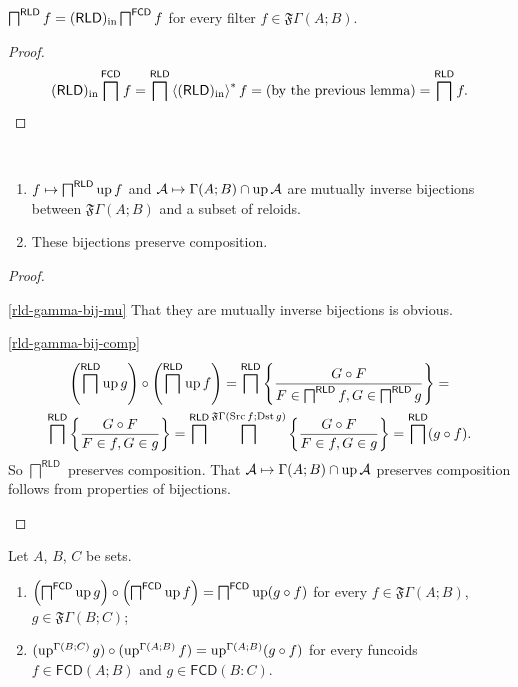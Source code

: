 \begin{lem}
\label{rld-in-fcd-meet}$\bigsqcap^{\mathsf{RLD}} f=(\mathsf{RLD})_{\mathrm{in}}\bigsqcap^{\mathsf{FCD}} f$
for every filter $f\in\mathfrak{F}\Gamma(A;B)$.\end{lem}
\begin{proof}
~
\[
(\mathsf{RLD})_{\mathrm{in}}\bigsqcap^{\mathsf{FCD}} f=\bigsqcap^{\mathsf{RLD}}\left\langle (\mathsf{RLD})_{\mathrm{in}}\right\rangle ^{\ast} f=
\text{(by the previous lemma)}=\bigsqcap^{\mathsf{RLD}} f.
\]
\end{proof}
\begin{lem}
\label{rld-gamma-bij}~
\begin{enumerate}
\item \label{rld-gamma-bij-mu}$f\mapsto\bigsqcap^{\mathsf{RLD}}\operatorname{up} f$
and $\mathcal{A}\mapsto\Gamma(A;B)\cap\operatorname{up}\mathcal{A}$ are mutually
inverse bijections between $\mathfrak{F}\Gamma(A;B)$ and a subset
of reloids.
\item \label{rld-gamma-bij-comp}These bijections preserve composition.
\end{enumerate}
\end{lem}
\begin{proof}
~
\begin{widedisorder}
\item [{\ref{rld-gamma-bij-mu}}] That they are mutually inverse bijections
is obvious.
\item [{\ref{rld-gamma-bij-comp}}] ~
\begin{multline*}
\left(\bigsqcap^{\mathsf{RLD}}\operatorname{up} g\right)\circ\left(\bigsqcap^{\mathsf{RLD}}\operatorname{up} f\right)=\bigsqcap^{\mathsf{RLD}}\left\{ \frac{G\circ F}{F\in\bigsqcap^{\mathsf{RLD}}f,G\in\bigsqcap^{\mathsf{RLD}}g}\right\}=\\
\bigsqcap^{\mathsf{RLD}}\left\{ \frac{G\circ F}{F\in f,G\in g}\right\}=\bigsqcap^{\mathsf{RLD}}\bigsqcap^{\mathfrak{F}\Gamma(\operatorname{Src} f;\operatorname{Dst} g)}\left\{ \frac{G\circ F}{F\in f,G\in g}\right\}=\bigsqcap^{\mathsf{RLD}}(g\circ f).
\end{multline*}
So $\bigsqcap^{\mathsf{RLD}}$ preserves composition. That $\mathcal{A}\mapsto\Gamma(A;B)\cap\operatorname{up}\mathcal{A}$
preserves composition follows from properties of bijections.
\end{widedisorder}
\end{proof}
\begin{lem}
Let $A$, $B$, $C$ be sets.
\begin{enumerate}
\item $\left(\bigsqcap^{\mathsf{FCD}}\operatorname{up} g\right)\circ\left(\bigsqcap^{\mathsf{FCD}}\operatorname{up} f\right)=\bigsqcap^{\mathsf{FCD}}\operatorname{up}(g\circ f)$
for every $f\in\mathfrak{F}\Gamma(A;B)$, $g\in\mathfrak{F}\Gamma(B;C)$;
\item $(\operatorname{up}^{\Gamma(B;C)}g)\circ(\operatorname{up}^{\Gamma(A;B)}f)=\operatorname{up}^{\Gamma(A;B)}(g\circ f)$
for every funcoids $f\in\mathsf{FCD}(A;B)$ and $g\in\mathsf{FCD}(B:C)$.
\end{enumerate}
\end{lem}
